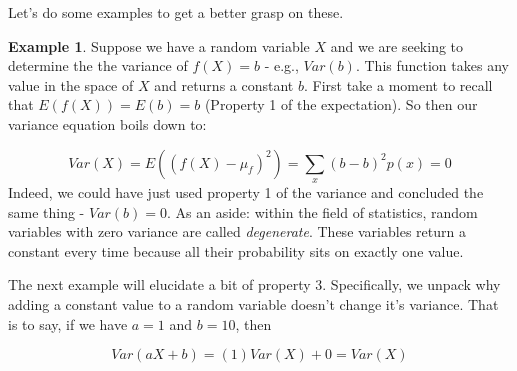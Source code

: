 \documentclass[
]{book}
\theoremstyle{definition}
\theoremstyle{definition}
\newtheorem{example}{Example}[chapter]
\theoremstyle{definition}
\theoremstyle{definition}
\theoremstyle{remark}
\begin{document}
Let's do some examples to get a better grasp on these.

\begin{example}
Suppose we have a random variable \(X\) and we are seeking to determine the the variance of \(f(X) = b\) - e.g., \(Var(b)\). This function takes any value in the space of \(X\) and returns a constant \(b\). First take a moment to recall that \(E(f(X)) = E(b) = b\) (Property 1 of the expectation). So then our variance equation boils down to:

\[
Var(X) = E((f(X)-\mu_f)^2) = \sum_{x}^{} (b - b)^2p(x) = 0
\]
Indeed, we could have just used property 1 of the variance and concluded the same thing - \(Var(b) = 0\). As an aside: within the field of statistics, random variables with zero variance are called \emph{degenerate}. These variables return a constant every time because all their probability sits on exactly one value.
\end{example}

The next example will elucidate a bit of property 3. Specifically, we unpack why adding a constant value to a random variable doesn't change it's variance. That is to say, if we have \(a = 1\) and \(b=10\), then

\[
Var(aX+b) = (1)Var(X) + 0 = Var(X) 
\]
\end{document}
